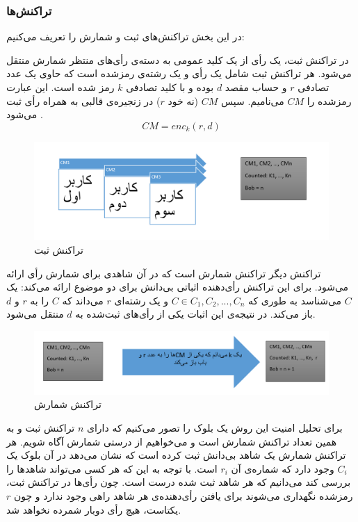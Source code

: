 \subsubsection{تراکنش‌ها}
در این بخش تراکنش‌های ثبت و شمارش را تعریف می‌کنیم:
\par
در تراکنش ثبت، یک رأی از یک کلید عمومی به دسته‌ی رأی‌های منتظر شمارش منتقل می‌شود. هر تراکنش ثبت شامل یک رأی و یک رشته‌ی 
رمزشده است که حاوی یک عدد تصادفی $r$ و حساب مقصد $d$ بوده و با کلید تصادفی $k$ رمز شده است. این عبارت رمز‌شده را $CM$ می‌نامیم. سپس $CM$ (نه خود $r$) در زنجیره‌ی قالبی به همراه رأی ثبت می‌شود
.
\\
\begin{equation}
CM = enc_{k} (r, d)
\label{eq:enc}
\end{equation}

\begin{figure}[h!]
	\centering
	\includegraphics[width=1\linewidth]{commit.PNG}
	\caption {تراکنش ثبت}
	\label{fig:commit}
\end{figure}

\par
تراکنش دیگر تراکنش شمارش است که در آن شاهدی برای شمارش رأی ارائه می‌شود. برای این تراکنش رأی‌دهنده اثباتی بی‌دانش برای دو موضوع ارائه می‌کند: یک $C$ می‌شناسد به طوری که  $C \in C_1, C_2, ... ,C_n$ و یک رشته‌ای $r$ می‌داند که $C$ را به $r$ و $d$ باز می‌کند. در نتیجه‌ی این اثبات یکی از رأی‌های ثبت‌شده به $d$ منتقل می‌شود. 

\begin{figure}[t]
	\centering
	\includegraphics[width=1\linewidth]{Count.PNG}
	\caption {تراکنش شمارش}
	\label{fig:count}
	\end{figure}
\par
برای تحلیل امنیت این روش یک بلوک را تصور می‌کنیم که دارای $n$ تراکنش ثبت و به همین تعداد تراکنش شمارش است و می‌خواهیم از درستی شمارش آگاه شویم. هر تراکنش شمارش یک شاهد بی‌دانش ثبت کرده است که نشان می‌دهد در آن بلوک یک $C_i$ وجود دارد که شماره‌ی آن $r_i$ است. با توجه به این که هر کسی می‌تواند شاهد‌ها را بررسی کند می‌دانیم که هر شاهد ثبت شده درست است. چون رأی‌‌ها در تراکنش ثبت، رمزشده نگهداری می‌شوند برای یافتن رأی‌دهنده‌ی هر شاهد راهی وجود ندارد و چون $r$یکتاست، هیچ رأی دوبار شمرده نخواهد شد.

